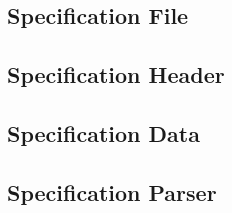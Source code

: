 \documentclass[a4paper,10pt]{article}
\begin{document}
\subsection{Specification File}

\subsection{Specification Header}

\subsection{Specification Data}

\subsection{Specification Parser}






\end{document}
